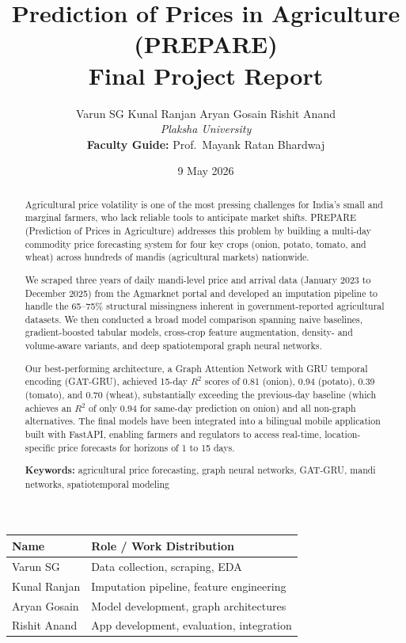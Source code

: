 \documentclass[12pt,a4paper]{article}
\title{\textbf{Prediction of Prices in Agriculture (PREPARE)} \\ \vspace{0.5cm} \large Final Project Report}
\author{
    Varun SG \quad Kunal Ranjan \quad Aryan Gosain \quad Rishit Anand \\[0.3cm]
    \textit{Plaksha University} \\[0.3cm]
    \textbf{Faculty Guide:} Prof.\ Mayank Ratan Bhardwaj
}
\date{9 May 2026}
\begin{document}
\maketitle

\begin{center}
\begin{tabular}{ll}
\toprule
\textbf{Name} & \textbf{Role / Work Distribution} \\
\midrule
Varun SG & Data collection, scraping, EDA \\
Kunal Ranjan & Imputation pipeline, feature engineering \\
Aryan Gosain & Model development, graph architectures \\
Rishit Anand & App development, evaluation, integration \\
\bottomrule
\end{tabular}
\end{center}

\vspace{1cm}

\begin{abstract}
Agricultural price volatility is one of the most pressing challenges for India's small and marginal farmers, who lack reliable tools to anticipate market shifts. PREPARE (Prediction of Prices in Agriculture) addresses this problem by building a multi-day commodity price forecasting system for four key crops (onion, potato, tomato, and wheat) across hundreds of mandis (agricultural markets) nationwide.

We scraped three years of daily mandi-level price and arrival data (January 2023 to December 2025) from the Agmarknet portal and developed an imputation pipeline to handle the 65--75\% structural missingness inherent in government-reported agricultural datasets. We then conducted a broad model comparison spanning naive baselines, gradient-boosted tabular models, cross-crop feature augmentation, density- and volume-aware variants, and deep spatiotemporal graph neural networks.

Our best-performing architecture, a Graph Attention Network with GRU temporal encoding (GAT-GRU), achieved 15-day $R^2$ scores of 0.81 (onion), 0.94 (potato), 0.39 (tomato), and 0.70 (wheat), substantially exceeding the previous-day baseline (which achieves an $R^2$ of only 0.94 for same-day prediction on onion) and all non-graph alternatives. The final models have been integrated into a bilingual mobile application built with FastAPI, enabling farmers and regulators to access real-time, location-specific price forecasts for horizons of 1 to 15 days.

\noindent\textbf{Keywords:} agricultural price forecasting, graph neural networks, GAT-GRU, mandi networks, spatiotemporal modeling
\end{abstract}
\end{document}
